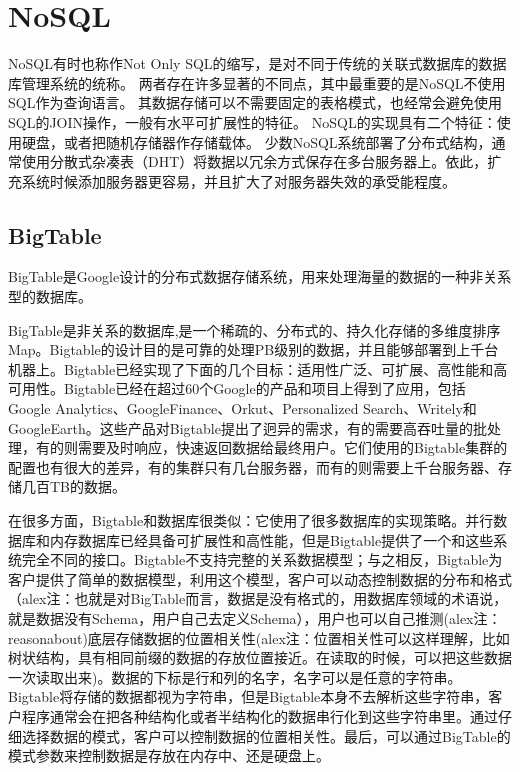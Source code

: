 \section{NoSQL}


NoSQL有时也称作Not Only SQL的缩写，是对不同于传统的关联式数据库的数据库管理系统的统称。
两者存在许多显著的不同点，其中最重要的是NoSQL不使用SQL作为查询语言。
其数据存储可以不需要固定的表格模式，也经常会避免使用SQL的JOIN操作，一般有水平可扩展性的特征。
NoSQL的实现具有二个特征：使用硬盘，或者把随机存储器作存储载体。
少数NoSQL系统部署了分布式结构，通常使用分散式杂凑表（DHT）将数据以冗余方式保存在多台服务器上。依此，扩充系统时候添加服务器更容易，并且扩大了对服务器失效的承受能程度。


\subsection{BigTable}
BigTable是Google设计的分布式数据存储系统，用来处理海量的数据的一种非关系型的数据库。

BigTable是非关系的数据库,是一个稀疏的、分布式的、持久化存储的多维度排序Map。Bigtable的设计目的是可靠的处理PB级别的数据，并且能够部署到上千台机器上。Bigtable已经实现了下面的几个目标：适用性广泛、可扩展、高性能和高可用性。Bigtable已经在超过60个Google的产品和项目上得到了应用，包括 Google Analytics、GoogleFinance、Orkut、Personalized Search、Writely和GoogleEarth。这些产品对Bigtable提出了迥异的需求，有的需要高吞吐量的批处理，有的则需要及时响应，快速返回数据给最终用户。它们使用的Bigtable集群的配置也有很大的差异，有的集群只有几台服务器，而有的则需要上千台服务器、存储几百TB的数据。

在很多方面，Bigtable和数据库很类似：它使用了很多数据库的实现策略。并行数据库和内存数据库已经具备可扩展性和高性能，但是Bigtable提供了一个和这些系统完全不同的接口。Bigtable不支持完整的关系数据模型；与之相反，Bigtable为客户提供了简单的数据模型，利用这个模型，客户可以动态控制数据的分布和格式（alex注：也就是对BigTable而言，数据是没有格式的，用数据库领域的术语说，就是数据没有Schema，用户自己去定义Schema），用户也可以自己推测(alex注：reasonabout)底层存储数据的位置相关性(alex注：位置相关性可以这样理解，比如树状结构，具有相同前缀的数据的存放位置接近。在读取的时候，可以把这些数据一次读取出来)。数据的下标是行和列的名字，名字可以是任意的字符串。Bigtable将存储的数据都视为字符串，但是Bigtable本身不去解析这些字符串，客户程序通常会在把各种结构化或者半结构化的数据串行化到这些字符串里。通过仔细选择数据的模式，客户可以控制数据的位置相关性。最后，可以通过BigTable的模式参数来控制数据是存放在内存中、还是硬盘上。

